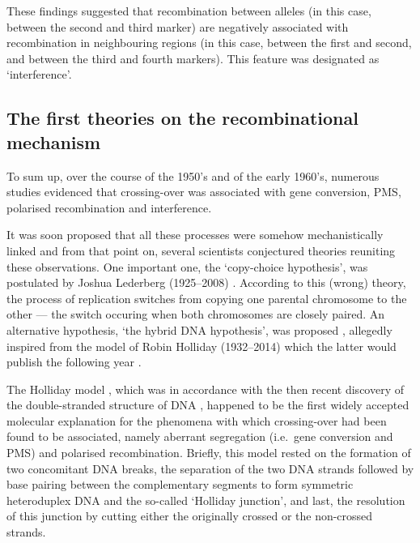 These findings suggested that recombination between alleles (in this case, between the second and third marker) are negatively associated with recombination in neighbouring regions (in this case, between the first and second, and between the third and fourth markers). This feature was designated as ‘interference’.







\subsection{The first theories on the recombinational mechanism}


To sum up, over the course of the 1950's and of the early 1960's, numerous studies evidenced that crossing-over was associated with gene conversion, PMS, polarised recombination and interference.

It was soon proposed that all these processes were somehow mechanistically linked \citep{perkins1962frequency} and from that point on, several scientists conjectured theories reuniting these observations.
One important one, the ‘copy-choice hypothesis’, was postulated by Joshua Lederberg (1925--2008) \citep{lederberg1955recombination}. According to this (wrong) theory, the process of replication switches from copying one parental chromosome to the other — the switch occuring when both chromosomes are closely paired.
An alternative hypothesis, ‘the hybrid DNA hypothesis’, was proposed \citep{whitehouse1963theory}, allegedly inspired from the model of Robin Holliday (1932--2014) \citep{holliday2011recombination} which the latter would publish the following year \citep{holliday1964mechanism}.

The Holliday model \citep{holliday1964mechanism,holliday1968genetic}, which was in accordance with the then recent discovery of the double-stranded structure of DNA \citep{franklin1953molecular,watson1953molecular,wilkins1953molecular}, happened to be the first widely accepted molecular explanation for the phenomena with which crossing-over had been found to be associated, namely aberrant segregation (i.e.\ gene conversion and PMS) and polarised recombination. 
Briefly, this model rested on the formation of two concomitant DNA breaks, the separation of the two DNA strands followed by base pairing between the complementary segments to form symmetric heteroduplex DNA and the so-called ‘Holliday junction’, and last, the resolution of this junction by cutting either the originally crossed or the non-crossed strands.

